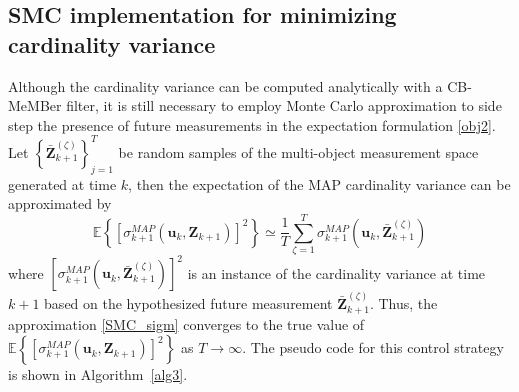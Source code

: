 \documentclass[twocolumn]{autart}
\begin{document}
\subsection{SMC implementation for minimizing cardinality variance}

Although the cardinality variance can be computed analytically with a CB-MeMBer filter, it is still
necessary to employ Monte Carlo approximation to side step the
presence of future measurements in the expectation formulation \eqref{obj2}. Let $\left\{ \bar{\mathbf{Z}}_{k+1}^{(\zeta)}\right\} _{j=1}^{T}$ be random samples of the
multi-object measurement space generated at time $k$, then the expectation
of the MAP cardinality variance can be approximated by
\begin{equation}
\mathbb{E}\left\{ \left[ \sigma _{k+1}^{MAP}\left( \mathbf{u}_{k},\mathbf{Z}_{k+1}\right) \right] ^{2}\right\} \simeq \frac{1}{T}\sum_{\zeta=1}^{T}\sigma _{k+1}^{MAP}\left( \mathbf{u}_{k},\bar{\mathbf{Z}}_{k+1}^{(\zeta)}\right)
\label{SMC_sigm}
\end{equation}where $\left[ \sigma _{k+1}^{MAP}\left( \mathbf{u}_{k},\bar{\mathbf{Z}}_{k+1}^{(\zeta)}\right) \right] ^{2}$ is an instance of the cardinality variance at time $k+1$ based on the hypothesized future measurement $\bar{\mathbf{Z}}_{k+1}^{(\zeta)}$. Thus, the approximation \eqref{SMC_sigm} converges to the true value of $\mathbb{E}\left\{ \left[ \sigma _{k+1}^{MAP}\left( \mathbf{u}_{k},\mathbf{Z}_{k+1}\right) \right] ^{2}\right\}$ as $T \rightarrow \infty $. The pseudo code for this
control strategy is shown in Algorithm~\ref{alg3}.
\end{document}
